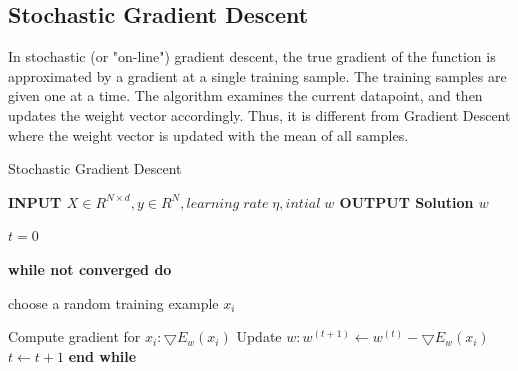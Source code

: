 \documentclass{sigplanconf}
\newlength\myindent
\newcommand\bindent{%
  \begingroup
  \setlength{\itemindent}{\myindent}
  \addtolength{\algorithmicindent}{\myindent}
}
\newcommand\eindent{\endgroup}
\begin{document}
\subsection{Stochastic Gradient Descent}
In stochastic (or "on-line") gradient descent, the true gradient of the function is approximated by a gradient at a
single training sample. The training samples are given one at a time. The algorithm examines the
current datapoint, and then updates the weight vector accordingly. Thus, it is different from Gradient Descent where the weight
vector is updated with the mean of all samples.

\begin{algorithm}
\caption{Stochastic Gradient Descent}
\begin{algorithmic} 

\STATE \bf{INPUT} \begin{math} X \in {R}^{N \times  d}, y \in R^N, learning\;  rate\;  \eta, intial\; w \end{math} 
\STATE \bf{OUTPUT} \textnormal{Solution} \begin{math}  w \end{math} 

	\STATE \textnormal{\begin{math} t = 0\end{math} }

	\STATE \bf{while} \textnormal{not converged} \bf{do}
    	\bindent
	 \STATE \textnormal{\indent choose a random training example \begin{math}x_i\end{math}}

	 \STATE \textnormal{\indent Compute gradient for \begin{math}x_i: \bigtriangledown{E_w(x_i)}\end{math}}
	 \STATE \textnormal{\indent Update \begin{math}w: w^{(t+1)} \gets w^{(t)} - \bigtriangledown{E_w(x_i)}\end{math}}
	 \STATE \textnormal{\indent \begin{math}t \gets t + 1\end{math}}
	    \eindent
	\STATE \bf{end while}

\end{algorithmic}
\end{algorithm}
\end{document}
